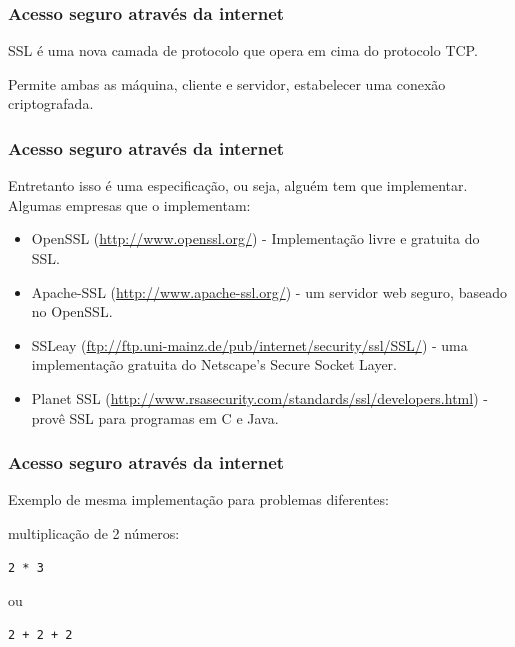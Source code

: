 \begin{frame}\frametitle{Acesso seguro através da internet}

SSL é uma nova camada de protocolo que opera em cima do protocolo TCP.

Permite ambas as máquina, cliente e servidor, estabelecer uma conexão
criptografada.

\end{frame}

\begin{frame}[fragile]\frametitle{Acesso seguro através da internet}

Entretanto isso é uma especificação, ou seja, alguém tem que
implementar. Algumas empresas que o implementam:

\begin{itemize}
\item
  OpenSSL (\href{openssl.org}{http://www.openssl.org/}) - Implementação
  livre e gratuita do SSL.
\item
  Apache-SSL (\href{apache-ssl.org}{http://www.apache-ssl.org/}) - um
  servidor web seguro, baseado no OpenSSL.
\item
  SSLeay (\url{ftp://ftp.uni-mainz.de/pub/internet/security/ssl/SSL/}) -
  uma implementação gratuita do Netscape's Secure Socket Layer.
\item
  Planet SSL
  (\url{http://www.rsasecurity.com/standards/ssl/developers.html}) -
  provê SSL para programas em C e Java.
\end{itemize}
\end{frame}

\begin{frame}[fragile]\frametitle{Acesso seguro através da internet}

Exemplo de mesma implementação para problemas diferentes:

multiplicação de 2 números:

\begin{verbatim}
2 * 3
\end{verbatim}
ou

\begin{verbatim}
2 + 2 + 2
\end{verbatim}
\end{frame}

\begin{frame}\frametitle{}


\end{frame}

